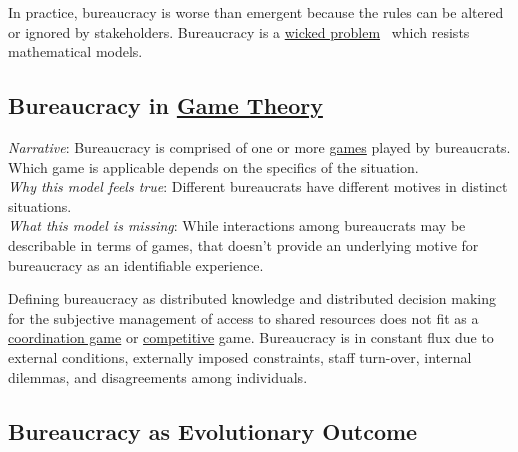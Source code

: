 In practice, bureaucracy is worse than emergent because the rules can be altered or ignored by  stakeholders. Bureaucracy is a \href{https://en.wikipedia.org/wiki/Wicked_problem}{wicked problem}~\cite{1973_Rittel} 
which resists mathematical models. 

\subsection*{Bureaucracy in \href{https://en.wikipedia.org/wiki/Game_theory}{Game Theory}}
\textit{Narrative}: Bureaucracy is comprised of one or more \href{https://en.wikipedia.org/wiki/List_of_games_in_game_theory}{games} 
played by bureaucrats. Which game is applicable depends on the specifics of the situation. \\
\textit{Why this model feels true}: Different bureaucrats have different motives in distinct situations. \\
\textit{What this model is missing}: While interactions among bureaucrats may be describable in terms of games, that doesn't provide an underlying motive for bureaucracy as an identifiable experience.  

Defining bureaucracy as distributed knowledge and distributed decision making for the subjective management of access to shared resources does not fit as a \href{https://en.wikipedia.org/wiki/Coordination_game}{coordination game} 
or \href{https://en.wikipedia.org/wiki/Non-cooperative_game_theory}{competitive} game. 
Bureaucracy is in constant flux due to external conditions, externally imposed constraints, staff turn-over, internal dilemmas, and disagreements among individuals. 




\subsection*{Bureaucracy as Evolutionary Outcome}


